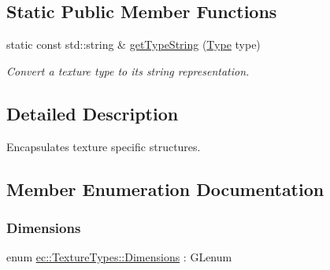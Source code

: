 \subsection*{Static Public Member Functions}
\begin{DoxyCompactItemize}
\item 
static const std\+::string \& \mbox{\hyperlink{structec_1_1_texture_types_aad3d1538e05d955cffc2c75feff20ea7}{get\+Type\+String}} (\mbox{\hyperlink{structec_1_1_texture_types_aff67825b98dd1edd7e4783350e866202}{Type}} type)
\begin{DoxyCompactList}\small\item\em Convert a texture type to its string representation. \end{DoxyCompactList}\end{DoxyCompactItemize}


\subsection{Detailed Description}
Encapsulates texture specific structures. 

\subsection{Member Enumeration Documentation}
\mbox{\label{structec_1_1_texture_types_ac0e07f24452fa28dd8e6e33a224842fc}} 
\subsubsection{\texorpdfstring{Dimensions}{Dimensions}}
{\footnotesize\ttfamily enum \mbox{\hyperlink{structec_1_1_texture_types_ac0e07f24452fa28dd8e6e33a224842fc}{ec\+::\+Texture\+Types\+::\+Dimensions}} \+: G\+Lenum}

